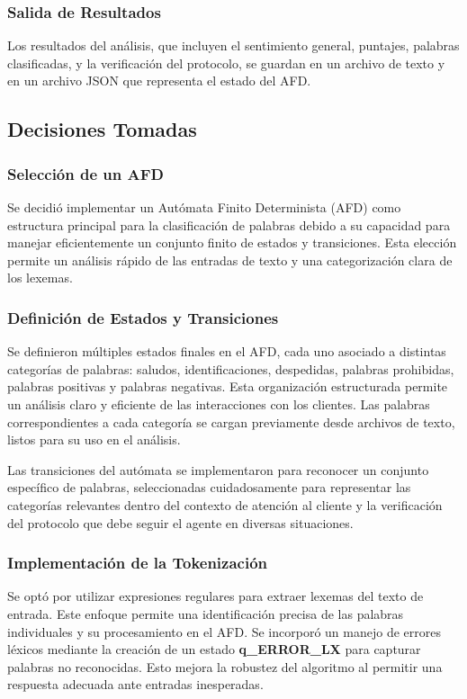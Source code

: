 \documentclass[12pt,a4paper]{article}
\begin{document}
\subsubsection{Salida de Resultados}
Los resultados del análisis, que incluyen el sentimiento general, puntajes, palabras clasificadas, y la verificación del protocolo, se guardan en un archivo de texto y en un archivo JSON que representa el estado del AFD.

\subsection{Decisiones Tomadas}
\subsubsection{Selección de un AFD}
Se decidió implementar un Autómata Finito Determinista (AFD) como estructura principal para la clasificación de palabras debido a su capacidad para manejar eficientemente un conjunto finito de estados y transiciones. Esta elección permite un análisis rápido de las entradas de texto y una categorización clara de los lexemas.
\subsubsection{Definición de Estados y Transiciones}
Se definieron múltiples estados finales en el AFD, cada uno asociado a distintas categorías de palabras: saludos, identificaciones, despedidas, palabras prohibidas, palabras positivas y palabras negativas. Esta organización estructurada permite un análisis claro y eficiente de las interacciones con los clientes. Las palabras correspondientes a cada categoría se cargan previamente desde archivos de texto, listos para su uso en el análisis.

Las transiciones del autómata se implementaron para reconocer un conjunto específico de palabras, seleccionadas cuidadosamente para representar las categorías relevantes dentro del contexto de atención al cliente y la verificación del protocolo que debe seguir el agente en diversas situaciones.
\subsubsection{Implementación de la Tokenización}
Se optó por utilizar expresiones regulares para extraer lexemas del texto de entrada. Este enfoque permite una identificación precisa de las palabras individuales y su procesamiento en el AFD.
Se incorporó un manejo de errores léxicos mediante la creación de un estado \textbf{q\_ERROR\_LX} para capturar palabras no reconocidas. Esto mejora la robustez del algoritmo al permitir una respuesta adecuada ante entradas inesperadas.
\end{document}
